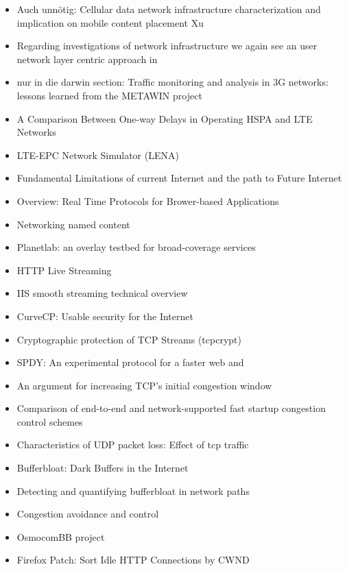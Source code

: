 \begin{itemize}
\item Auch unnötig: Cellular data network infrastructure characterization and implication on mobile content placement Xu\cite{Xu:2011:CDN:2007116.2007149}
\item Regarding investigations of network infrastructure we again see an user network layer centric approach in \cite{Xu:2011:CDN:2007116.2007149}
\item nur in die darwin section: Traffic monitoring and analysis in 3G networks: lessons learned from the METAWIN project \cite{ricciato2006traffic}
\item A Comparison Between One-way Delays in Operating HSPA and LTE Networks \cite{laner2012delaycomparison}
\item LTE-EPC Network Simulator (LENA) \cite{ns3lte}
\item Fundamental Limitations of current Internet and the path to Future Internet \cite{ec2011fundamental}
\item Overview: Real Time Protocols for Brower-based Applications\cite{ietf2011rtcwebdraft}
\item Networking named content \cite{jacobson2009networking}
\item Planetlab: an overlay testbed for broad-coverage services \cite{chun2003planetlab}
\item HTTP Live Streaming \cite{pantos2011livestreaming}
\item IIS smooth streaming technical overview \cite{zambelli_iis_2009}
\item CurveCP: Usable security for the Internet \cite{curvecpwww}
\item Cryptographic protection of TCP Streams (tcpcrypt) \cite{tcpcrypt}
\item SPDY: An experimental protocol for a faster web \cite{google2011SPDYdef} and \cite{google2010SPDYwp}
\item An argument for increasing TCP's initial congestion window \cite{dukkipati2010argument}
\item Comparison of end-to-end and network-supported fast startup congestion control schemes \cite{scharf2011comparison}
\item Characteristics of UDP packet loss: Effect of tcp traffic \cite{sawashima97characteristics}
\item Bufferbloat: Dark Buffers in the Internet \cite{gettys2011bufferbloat}
\item Detecting and quantifying bufferbloat in network paths \cite{groenewegen2011detecting}
\item Congestion avoidance and control \cite{jacobson1988congestion}
\item OsmocomBB project \cite{osmocombbwww}
\item Firefox Patch: Sort Idle HTTP Connections by CWND \cite{ffSortCWND}



\end{itemize}
